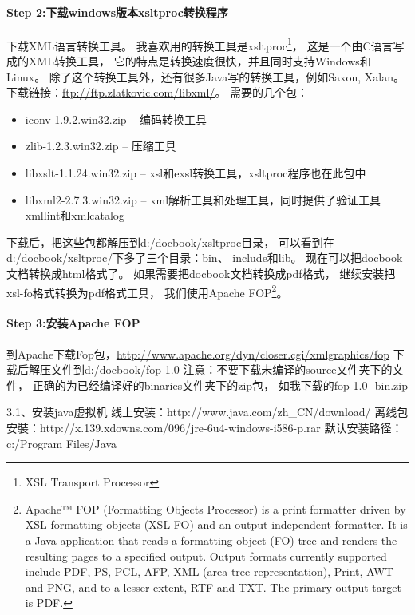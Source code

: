 \documentclass{book}
\begin{document}
\paragraph{Step 2:下载windows版本xsltproc转换程序}

下载XML语言转换工具。
我喜欢用的转换工具是xsltproc\footnote{XSL Transport Processor}，
这是一个由C语言写成的XML转换工具，
它的特点是转换速度很快，并且同时支持Windows和Linux。
除了这个转换工具外，还有很多Java写的转换工具，例如Saxon, Xalan。 
下载链接：\url{ftp://ftp.zlatkovic.com/libxml/}。
需要的几个包：

\begin{itemize}
\item{iconv-1.9.2.win32.zip – 编码转换工具}
\item{zlib-1.2.3.win32.zip – 压缩工具}
\item{libxslt-1.1.24.win32.zip – xsl和exsl转换工具，xsltproc程序也在此包中}
\item{libxml2-2.7.3.win32.zip – xml解析工具和处理工具，同时提供了验证工具xmllint和xmlcatalog}
\end{itemize}

下载后，把这些包都解压到d:/docbook/xsltproc目录，
可以看到在d:/docbook/xsltproc/下多了三个目录：bin、 include和lib。
现在可以把docbook文档转换成html格式了。
如果需要把docbook文档转换成pdf格式，
继续安装把xsl-fo格式转换为pdf格式工具，
我们使用Apache FOP\footnote{Apache™ FOP (Formatting Objects Processor) 
is a print formatter driven by XSL formatting objects (XSL-FO) and an output independent formatter. 
It is a Java application that reads a formatting object (FO) tree 
and renders the resulting pages to a specified output. 
Output formats currently supported include PDF, PS, 
PCL, AFP, XML (area tree representation), Print, AWT and PNG, 
and to a lesser extent, RTF and TXT. The primary output target is PDF.}。

\paragraph{Step 3:安装Apache FOP}

到Apache下载Fop包，\url{http://www.apache.org/dyn/closer.cgi/xmlgraphics/fop}
下载后解压文件到d:/docbook/fop-1.0
注意：不要下载未编译的source文件夹下的文件，
正确的为已经编译好的binaries文件夹下的zip包，
如我下载的fop-1.0- bin.zip


3.1、安装java虚拟机
线上安装：http://www.java.com/zh\_CN/download/
离线包安裝：http://x.139.xdowns.com/096/jre-6u4-windows-i586-p.rar
默认安装路径：c:/Program Files/Java
\end{document}

